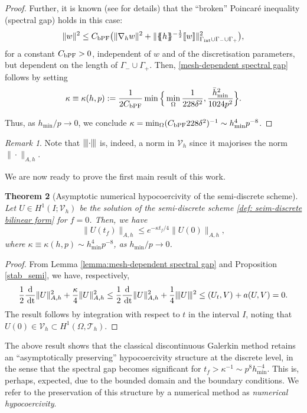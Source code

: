 \documentclass{amsart}
\newcommand{\norm}[2]{\|{#1}\|_{{#2}}}
\newcommand{\jump}[1]{[\kern-0.6mm [{#1}]\kern-0.6mm]}
\newcommand{\av}[1]{\{\kern-1.2mm \{{#1}\}\kern-1.2mm\}}
\newcommand{\dee}{{\rm d}}
\newcommand{\inner}[3]{({#1},{#2})_{{#3}}}
\newcommand{\Th}{\mathcal{T}_h}
\newcommand{\gint}{\Gamma_{\rm int}}
\newcommand{\gif}{\Gamma_-}
\newcommand{\ndg}[1]{|\kern-.03cm \|{#1}|\kern-.03cm \|}
\newcommand{\avg }[1]{ \av{ #1}}
\newcommand{\dt}{\,{\rm dt}}
\newcommand{\barhmin}{\bar{h}_{\min}}
\newtheorem{theorem}{Theorem}[section]
\theoremstyle{definition}
\theoremstyle{remark}
\newtheorem{remark}[theorem]{Remark}
\numberwithin{equation}{section}
\begin{document}
\begin{proof}
Further, it is known (see  {\cite[Theorem 1.6]{botti2025sobolev} for details}) that the ``broken''  {Poincar\'e} inequality (spectral gap)  holds in this case:
\begin{equation}\label{broken_poinc}
\norm{w}{}^2 \leq C_{\rm bPF} \big(  \norm{\nabla_h w}{}^2 +\norm{\avg{h}^{-\frac{1}{2}}\jump{w}}{\gint \cup\gif\cup\Gamma_+}^2 \big),
\end{equation}
for a constant $C_{\rm bPF}>0$, independent of $w$ and of the discretisation parameters, but dependent on the length of $\gif\cup\Gamma_+$. Then, \eqref{mesh-dependent spectral gap} follows by setting
\[
\kappa\equiv\kappa(h,p):=\frac{1}{2C_{\rm bPF}}  \min\Big \{\min_\Omega\frac{1}{228\delta^2},  \frac{\barhmin^2}{1024p^2}\Big\}.
\]



Thus, as $h_{\min}/p\to 0$, we conclude $\kappa= \min_{\Omega}(C_{\rm bPF} 228\delta^{2})^{-1}\sim  h_{\min}^4 p^{-8}$.
    \end{proof}

 {
\begin{remark}
Note that $\ndg{\cdot}$ is, indeed, a norm in $\mathcal{V}_{h}$ since it majorises the norm $\norm{\cdot}{A,h}$.
\end{remark}
}

We are now ready to prove the first main result of this work.
\begin{theorem}[Asymptotic numerical hypocoercivity of the semi-discrete scheme]\label{main_SD}
    Let $U \in H^1(I; {\mathcal{V}}_h)$ be the solution of the semi-discrete scheme \eqref{def: seim-discrete bilinear form} for $f=0$. Then, we have
    \begin{equation}\label{hypoSUPG_stab_semidsicrete}
    \norm{U(t_f)}{ {A,h}}\le e^{-\kappa t_f/4} \norm{U(0)}{ {A,h}},
    \end{equation}
 {where $\kappa\equiv \kappa(h,p)\sim h^4_{\min} p^{-8}$, as $h_{\min}/ p\to 0$}.
\end{theorem}
\begin{proof}
	From Lemma \ref{lemma:mesh-dependent spectral gap} and Proposition \ref{stab_semi}, we have, respectively,
	\begin{equation}\label{eq: semi-discrete dG hypocoercivity}
		\begin{aligned}
			\frac{1}{2}\frac{\dee}{\dt}\norm{U}{ {A,h}}^2+ \frac{\kappa}{4} \norm{U}{ {A,h}}^2\le 		\frac{1}{2}\frac{\dee}{\dt}\norm{U}{ {A,h}}^2+	\frac{1}{4}\ndg{U}^2
			\le   \inner{U_t}{V}{}  + a(U,V)= 0.
		\end{aligned}
	\end{equation}
	The result follows by integration with respect to $t$ in the interval $I$, noting that $U(0)\in  {\mathcal{V}}_h\subset H^1(\Omega,\Th)$.
\end{proof}
The above result shows that the classical discontinuous Galerkin method retains an ``asymptotically preserving'' hypocoercivity structure at the discrete level, in the sense that the spectral gap becomes significant for $t_f>\kappa^{-1}\sim p^8h_{\min}^{-4}$. This is, perhaps, expected, due to the bounded domain and the boundary conditions. We refer to the preservation of this structure by a numerical method as \emph{numerical hypocoercivity}.
\end{document}
